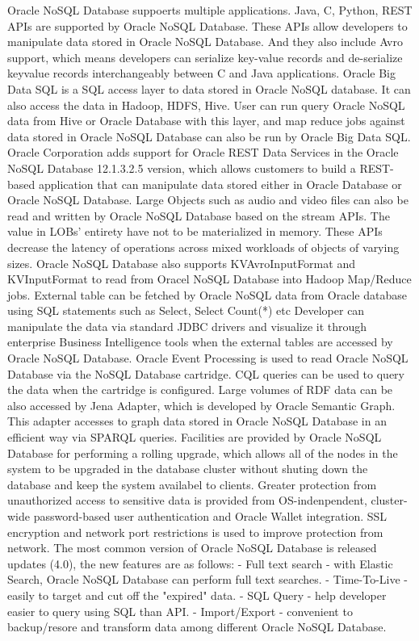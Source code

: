 Oracle NoSQL Database suppoerts multiple applications. 
Java, C, Python, REST APIs are supported by Oracle NoSQL Database. These APIs allow developers to manipulate data stored in Oracle NoSQL Database. And they also include Avro support, which means developers can serialize key-value records and de-serialize keyvalue records interchangeably between C and Java applications.\cite{hid-sp18-515-editor01}
Oracle Big Data SQL is a SQL access layer to data stored in Oracle NoSQL database. It can also access the data in Hadoop, HDFS, Hive. User can run query Oracle NoSQL data from Hive or Oracle Database with this layer, and map reduce jobs against data stored in Oracle NoSQL Database can also be run by Oracle Big Data SQL. 
Oracle Corporation adds support for Oracle REST Data Services in the Oracle NoSQL Database 12.1.3.2.5 version, which allows customers to build a REST-based application that can manipulate data stored either in Oracle Database or Oracle NoSQL Database. 
Large Objects such as audio and video files can also be read and written by Oracle NoSQL Database based on the stream APIs. The value in LOBs' entirety have not to be materialized in memory. These APIs decrease the latency of operations across mixed workloads of objects of varying sizes. 
Oracle NoSQL Database also supports KVAvroInputFormat and KVInputFormat to read from Oracel NoSQL Database into Hadoop Map/Reduce jobs. 
External table can be fetched by Oracle NoSQL data from Oracle database using SQL statements such as Select, Select Count(*) etc Developer can manipulate the data via standard JDBC drivers and visualize it through enterprise Business Intelligence tools when the external tables are accessed by Oracle NoSQL Database. 
Oracle Event Processing is used to read Oracle NoSQL Database via the NoSQL Database cartridge. CQL queries can be used to query the data when the cartridge is configured. Large volumes of RDF data can be also accessed by Jena Adapter, which is developed by Oracle Semantic Graph. This adapter accesses to graph data stored in Oracle NoSQL Database in an efficient way via SPARQL queries. 
Facilities are provided by Oracle NoSQL Database for performing a rolling upgrade, which allows all of the nodes in the system to be upgraded in the database cluster without shuting down the database and keep the system availabel to clients. 
Greater protection from unauthorized access to sensitive data is provided from OS-indenpendent, cluster-wide password-based user authentication and Oracle Wallet integration. SSL encryption and network port restrictions is used to improve protection from network. 
The most common version of Oracle NoSQL Database is released updates (4.0), the new features are as follows:
- Full text search - with Elastic Search, Oracle NoSQL Database can perform full text searches.
- Time-To-Live - easily to target and cut off the "expired" data.
- SQL Query - help developer easier to query using SQL than API.
- Import/Export - convenient to backup/resore and transform data among different Oracle NoSQL Database. 

